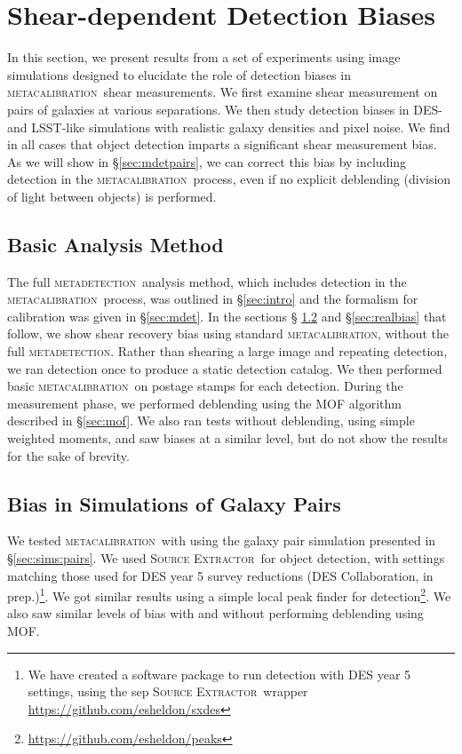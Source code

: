 \documentclass[draft, iop, twocolappendix, appendixfloats, numberedappendix, apj]{hackemulateapj}
\newcommand{\mcal}{\textsc{metacalibration}}
\newcommand{\mdet}{\textsc{metadetection}}
\newcommand{\sx}{\textsc{Source Extractor}}
\begin{document}
\section{Shear-dependent Detection Biases}\label{sec:detbiases}

In this section, we present results from a set of experiments using image
simulations designed to elucidate the role of detection biases in \mcal\ shear
measurements.  We first examine shear measurement on pairs of galaxies at
various separations.  We then study detection biases in DES- and LSST-like
simulations with realistic galaxy densities and pixel noise. We find in all
cases that object detection imparts a significant shear measurement bias. As we
will show in \S \ref{sec:mdetpairs}, we can correct this bias by including
detection in the \mcal\ process, even if no explicit deblending (division of
light between objects) is performed.

\subsection{Basic Analysis Method}

The full \mdet\ analysis method, which includes detection in the \mcal\
process, was outlined in \S \ref{sec:intro} and the formalism for calibration
was given in \S \ref{sec:mdet}.  In the sections \S
\ref{sec:pairbias} and \S \ref{sec:realbias} that follow, we show shear
recovery bias using standard \mcal, without the full \mdet.   Rather than shearing
a large image and repeating detection, we ran detection once to produce a
static detection catalog.  We then performed basic \mcal\ on postage stamps for
each detection.  During the measurement phase, we performed deblending using
the MOF algorithm described in \S \ref{sec:mof}.  We also ran tests without
deblending, using simple weighted moments, and saw biases at a similar level,
but do not show the results for the sake of brevity.

\subsection{Bias in Simulations of Galaxy Pairs} \label{sec:pairbias}

We tested \mcal\ with using the galaxy pair simulation presented
in \S \ref{sec:sims:pairs}. We used \sx\ for object detection, with settings
matching those used for DES year 5 survey reductions (DES Collaboration, in
prep.)\footnote{We have created a software package to run detection with DES
year 5 settings, using the sep \sx\ wrapper
\url{https://github.com/esheldon/sxdes}}.  We got similar results using a
simple local peak finder for
detection\footnote{\url{https://github.com/esheldon/peaks}}.  We also saw
similar levels of bias with and without performing deblending using MOF.
\end{document}
